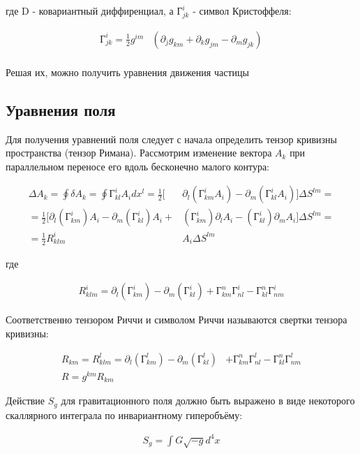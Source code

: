 \documentclass[a4paper,14pt]{article}
\begin{document}
	где D - ковариантный диффиренциал, а $ Г_{jk}^i $ - символ Кристоффеля: 

	\begin{align*}
		Г_{jk}^i = \frac{1}{2} g^{im} & ( \partial_{j} g_{km} + \partial_{k} g_{jm} - \partial_{m} g_{jk} ) \\
	\end{align*}

	Решая их, можно получить уравнения движения частицы

\subsection*{Уравнения поля}	
	
	Для получения уравнений поля следует с начала определить тензор кривизны пространства (тензор Римана). Рассмотрим изменение вектора $ A_k $ при параллельном переносе его вдоль бесконечно малого контура:

	\begin{align*}
		\Delta A_k = \oint \delta A_k = \oint Г_{kl}^i A_i dx^l 
		= \frac{1}{2} [ & \partial_l (Г_{km}^i A_i) - \partial_m (Г_{kl}^i A_i)] \Delta S^{lm} = \\
		= \frac{1}{2} [   \partial_l (Г_{km}^i) A_i - \partial_m (Г_{kl}^i) A_i + & (Г_{km}^i) \partial_l A_i - (Г_{kl}^i) \partial_m A_i ] \Delta S^{lm} = \\
		= \frac{1}{2} R^i_{klm} & A_i \Delta S^{lm}
	\end{align*}

	где 

	\begin{align*}
		R^i_{klm} = \partial_l (Г_{km}^i) - \partial_m (Г_{kl}^i)  + Г_{km}^n Г_{nl}^i - Г_{kl}^n Г_{nm}^i
	\end{align*}

	Соответственно тензором Риччи и символом Риччи называются свертки тензора кривизны:

	\begin{align*}
		R_{km} = R^l_{klm} = \partial_l (Г_{km}^l) - \partial_m (Г_{kl}^l) & + Г_{km}^n Г_{nl}^l - Г_{kl}^n Г_{nm}^l \\
		R  = g^{km} R_{km} &
	\end{align*}

	Действие $ S_g $ для гравитационного поля должно быть выражено в виде некоторого скаллярного интеграла по инвариантному гиперобъёму:

	\begin{align*}
		S_g = \int G \sqrt{-g} d^4 x
	\end{align*}
\end{document}
